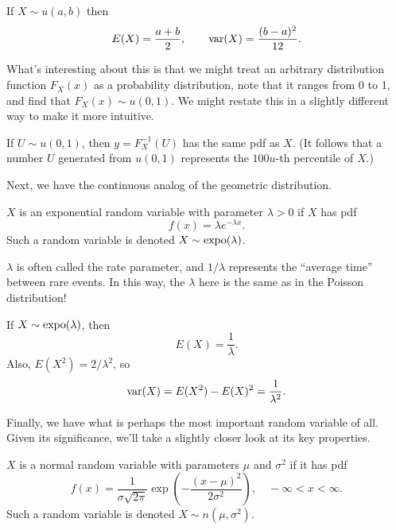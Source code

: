 \documentclass[../m157main.tex]{subfiles}
\begin{document}
\begin{theorem}
    If $X \sim u(a,b)$ then
    \[ E(X) = \frac{a+b}{2}, \qquad \operatorname{var}(X) = \frac{(b-a)^2}{12}. \]
\end{theorem}

What's interesting about this is that we might treat an arbitrary distribution function $F_X(x)$ as a probability distribution, note that it ranges from 0 to 1, and find that $F_X(x) \sim u(0,1)$.
We might restate this in a slightly different way to make it more intuitive.

\begin{theorem}[]
    If $U \sim u(0,1)$, then $y = F_X^{-1}(U)$ has the same pdf as $X$.
    (It follows that a number $U$ generated from $u(0,1)$ represents the $100u$-th percentile of $X$.)
\end{theorem}

Next, we have the continuous analog of the geometric distribution.

\begin{definition}
    $X$ is an exponential random variable with parameter $\lambda > 0$ if $X$ has pdf
    \[ f(x) = \lambda e^{-\lambda x}. \]
    Such a random variable is denoted $X \sim \operatorname{expo}(\lambda)$.
\end{definition}

$\lambda$ is often called the rate parameter, and $1 / \lambda$ represents the ``average time'' between rare events.
In this way, the $\lambda$ here is the same as in the Poisson distribution!

\begin{theorem}
    If $X \sim \operatorname{expo}(\lambda)$, then
    \[ E(X) = \frac{1}{\lambda}. \]
    Also, $E(X^2) = 2 / \lambda^2$, so
    \[ \operatorname{var}(X) = E(X^2) - E(X)^2 = \frac{1}{\lambda^2}. \]
\end{theorem}

Finally, we have what is perhaps the most important random variable of all.
Given its significance, we'll take a slightly closer look at its key properties.

\begin{definition}
    $X$ is a normal random variable with parameters $\mu$ and $\sigma^2$ if it has pdf
    \[ f(x) = \frac{1}{\sigma \sqrt{2\pi}} \exp \left( -\frac{(x-\mu)^2}{2\sigma^2} \right), \quad -\infty < x < \infty. \]
    Such a random variable is denoted $X \sim n(\mu, \sigma^2)$.
\end{definition}
\end{document}
